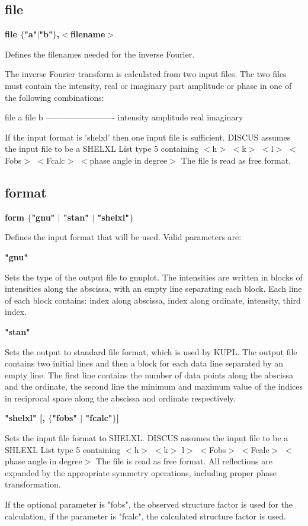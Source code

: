 \subsection*{file}
{\bf file $ \{$"a"$| $"b"$\} $,$ <$filename$> $ \par }
\par
\vspace{3pt}
Defines the filenames needed for the inverse Fourier. 
\par
The inverse Fourier transform is calculated from two input files. 
The two files must contain the intensity, real or imaginary part 
amplitude or phase in one of the following combinations: 
\par
\begin{MacVerbatim}
file a          file b
-------------------------
intensity
amplitude
real            imaginary
\end{MacVerbatim}
If the input format is 'shelxl' then one input file is sufficient. 
DISCUS assumes the input file to be a SHELXL List type 5 containing 
$ <$h$> $ $ <$k$> $ $ <$l$> $ $ <$Fobs$> $ $ <$Fcalc$> $ $ <$phase angle in degree$> $ 
The file is read as free format. 
\subsection*{format}
{\bf form $ \{$"gnu" $| $ "stan" $| $ "shelxl"$\} $ \par }
\par
\vspace{3pt}
Defines the input format that will be used. 
Valid parameters are: 
\par
{\bf "gnu" \par }
\vspace{3pt}
Sets the type of the output file to gnuplot. The intensities are 
written in blocks of intensities along the abscissa, with an empty 
line separating each block. Each line of each block contains: 
index along abscissa, index along ordinate, intensity, third index. 
\par
{\bf "stan" \par }
\vspace{3pt}
Sets the output to standard file format, which is used by KUPL. 
The output file contains two initial lines and then a block for each 
data line separated by an empty line. The first line contains the 
number of data points along the abscissa and the ordinate, the 
second line the minimum and maximum value of the indices in reciprocal 
space along the abscissa and ordinate respectively. 
\par
{\bf "shelxl" [, $ \{$"fobs" $| $ "fcalc"$\} $] \par }
\vspace{3pt}
Sets the input file format to SHELXL. DISCUS assumes the input file 
to be a SHLEXL List type 5 containing 
$ <$h$> $ $ <$k$> $ l$> $ $ <$Fobs$> $ $ <$Fcalc$> $ $ <$phase angle in degree$> $ 
The file is read as free format. All reflections are expanded by the 
appropriate symmetry operations, including proper phase transformation. 
\par
If the optional parameter is "fobs", the observed structure factor is 
used for the calculation, if the parameter is "fcalc", the calculated 
structure factor is used. 
\par
